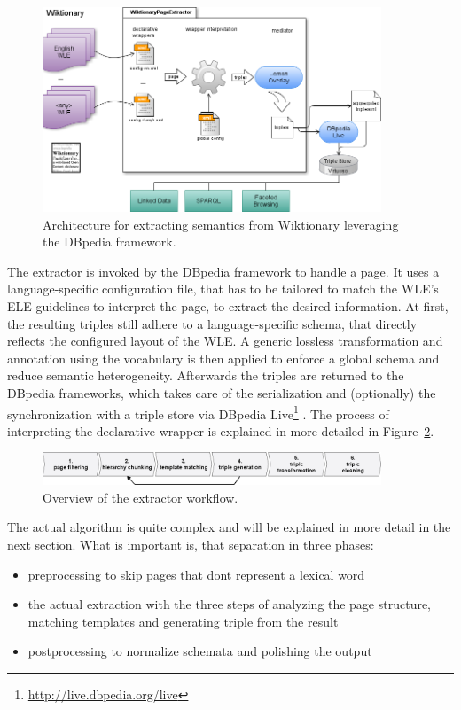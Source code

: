 \begin{figure}[tb]
\centering
\includegraphics[width=0.9\textwidth]{./images/architecture.png}
\caption{Architecture for extracting semantics from Wiktionary leveraging the DBpedia framework.}
\label{fig:architecture}
\end{figure}
The \wik extractor is invoked by the DBpedia framework to handle a page.
It uses a language-specific configuration file, that has to be tailored to match the WLE's ELE guidelines to interpret the page, to extract the desired information. 
At first, the resulting triples still adhere to a language-specific schema, that directly reflects the configured layout of the WLE. 
A generic lossless transformation and annotation using the \lemon vocabulary is then applied to enforce a global schema and reduce semantic heterogeneity. 
Afterwards the triples are returned to the DBpedia frameworks, which takes care of the serialization and (optionally) the synchronization with a triple store via DBpedia Live\footnote{\url{http://live.dbpedia.org/live}} \cite{dbpedia_live_2012}.
The process of interpreting the declarative wrapper is explained in more detailed in Figure~\ref{fig:extractor}.

\begin{figure}[tb]
\centering
\includegraphics[width=0.9\textwidth]{./images/extractor.png}
\caption{Overview of the extractor workflow.}
\label{fig:extractor}
\end{figure}

The actual algorithm is quite complex and will be explained in more detail in the next section. What is important is, that separation in three phases: 
\begin{itemize}
\item preprocessing to skip pages that dont represent a lexical word
\item the actual extraction with the three steps of analyzing the page structure, matching templates and generating triple from the result
\item postprocessing to normalize schemata and polishing the output
\end{itemize}
\vfill
\newpage

